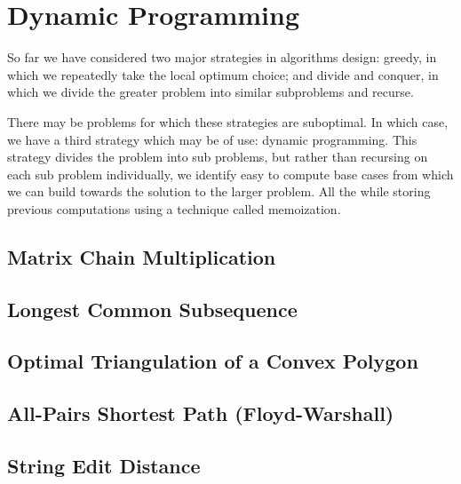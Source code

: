 \chapter{Dynamic Programming}

So far we have considered two major strategies in algorithms design:
greedy, in which we repeatedly take the local optimum choice; and
divide and conquer, in which we divide the greater problem into
similar subproblems and recurse.

There may be problems for which these strategies are suboptimal.  In
which case, we have a third strategy which may be of use: dynamic
programming.  This strategy divides the problem into sub problems, but
rather than recursing on each sub problem individually, we identify
easy to compute base cases from which we can build towards the
solution to the larger problem.  All the while storing previous
computations using a technique called memoization.

\section{Matrix Chain Multiplication}

\section{Longest Common Subsequence}

\section{Optimal Triangulation of a Convex Polygon}



\hypertarget{sec:floyd_warshall}{\section{All-Pairs Shortest Path (Floyd-Warshall)}}

\section{String Edit Distance}

